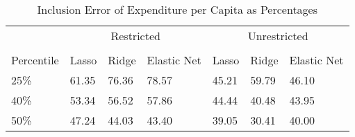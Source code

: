 
\begin{table}[h]
\caption{Inclusion Error of Expenditure per Capita as Percentages}
    \centering
    \begin{tabular}{lllllll}
        \toprule
        {} & \multicolumn{3}{c}{Restricted} & \multicolumn{3}{c}{Unrestricted}\\
        \cmidrule(lr){2-4} \cmidrule(lr){5-7} \\
        Percentile & Lasso & Ridge & Elastic Net  & Lasso & Ridge & Elastic Net \\
        \midrule
        25\% &61.35&76.36&78.57&45.21		&	59.79	&		46.10\\
40\%&		53.34	&		56.52	&		57.86& 44.44	&		40.48	&		43.95\\
50\%	&	47.24	&		44.03&			43.40 &	39.05	&		30.41 	&		40.00\\
        \bottomrule
    \end{tabular}
    \label{table:6}
\end{table}

